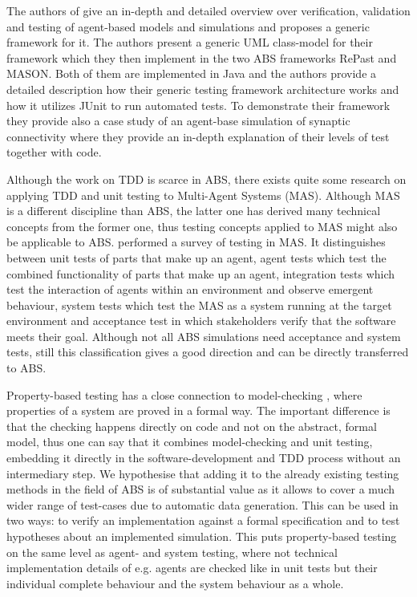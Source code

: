 The authors of \cite{gurcan_generic_2013} give an in-depth and detailed overview over verification, validation and testing of agent-based models and simulations and proposes a generic framework for it. The authors present a generic UML class-model for their framework which they then implement in the two ABS frameworks RePast and MASON. Both of them are implemented in Java and the authors provide a detailed description how their generic testing framework architecture works and how it utilizes JUnit to run automated tests. To demonstrate their framework they provide also a case study of an agent-base simulation of synaptic connectivity where they provide an in-depth explanation of their levels of test together with code.

Although the work on TDD is scarce in ABS, there exists quite some research on applying TDD and unit testing to Multi-Agent Systems (MAS). Although MAS is a different discipline than ABS, the latter one has derived many technical concepts from the former one, thus testing concepts applied to MAS might also be applicable to ABS. \cite{nguyen_testing_2011} performed a survey of testing in MAS. It distinguishes between unit tests of parts that make up an agent, agent tests which test the combined functionality of parts that make up an agent, integration tests which test the interaction of agents within an environment and observe emergent behaviour, system tests which test the MAS as a system running at the target environment and acceptance test in which stakeholders verify that the software meets their goal. Although not all ABS simulations need acceptance and system tests, still this classification gives a good direction and can be directly transferred to ABS. 

Property-based testing has a close connection to model-checking \cite{mcmillan_symbolic_1993}, where properties of a system are proved in a formal way. The important difference is that the checking happens directly on code and not on the abstract, formal model, thus one can say that it combines model-checking and unit testing, embedding it directly in the software-development and TDD process without an intermediary step. We hypothesise that adding it to the already existing testing methods in the field of ABS is of substantial value as it allows to cover a much wider range of test-cases due to automatic data generation. This can be used in two ways: to verify an implementation against a formal specification and to test hypotheses about an implemented simulation. This puts property-based testing on the same level as agent- and system testing, where not technical implementation details of e.g. agents are checked like in unit tests but their individual complete behaviour and the system behaviour as a whole.

